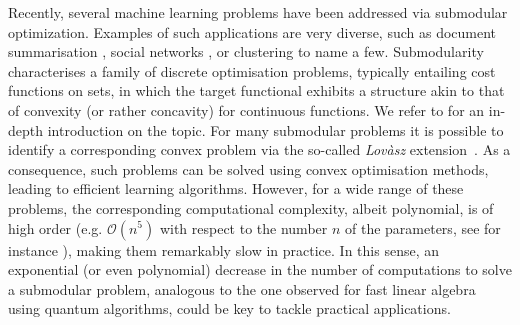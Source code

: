 \documentclass[a4paper, 11pt]{article}
\begin{document}
Recently, several machine learning problems have been addressed via submodular optimization. Examples of such applications are very diverse, such as document
summarisation \cite{lin2011class}, social networks \cite{kempe2003maximizing}, or clustering \cite{narasimhan2007local} to name a few. Submodularity characterises a family of discrete optimisation problems, typically entailing cost functions on sets, in which the target functional exhibits a structure akin to that of convexity (or rather concavity) for continuous functions. We refer to \cite{bach2015submodular} for an in-depth introduction on the topic. For many submodular problems it is possible to identify a corresponding convex problem via the so-called {\em Lov\`asz} extension~\cite{lovasz1982submodular}. As a consequence, such problems can be solved using convex optimisation methods, leading to efficient learning algorithms. However, for a wide range of these problems, the corresponding computational complexity, albeit polynomial, is of high order (e.g. $\mathcal O(n^5)$ with respect to the number $n$ of the parameters, see for instance \cite{schrijver2000combinatorial,iwata2001combinatorial,orlin2009faster}), making them remarkably slow in practice. In this sense, an exponential (or even polynomial) decrease in the number of computations to solve a submodular problem, analogous to the one observed for fast linear algebra using quantum algorithms, could be key to tackle practical applications.





\end{document}
